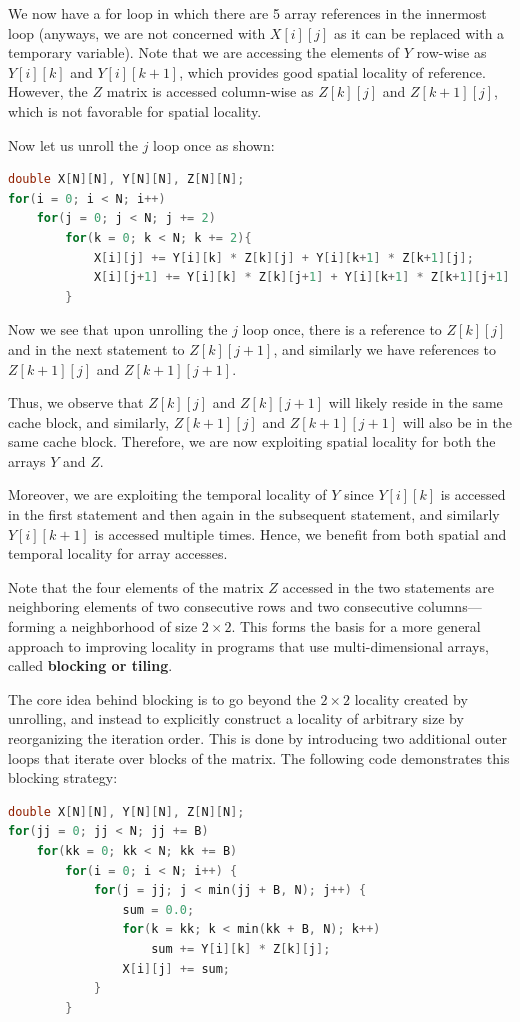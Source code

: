\documentclass[12pt]{book}
\begin{document}
We now have a for loop in which there are 5 array references in the innermost loop (anyways, we are not concerned with $X[i][j]$ as it can be replaced with a temporary variable). Note that we are accessing the elements of $Y$ row-wise as $Y[i][k]$ and $Y[i][k+1]$, which provides good spatial locality of reference. However, the $Z$ matrix is accessed column-wise as $Z[k][j]$ and $Z[k+1][j]$, which is not favorable for spatial locality.

Now let us unroll the $j$ loop once as shown:
\begin{lstlisting}[language=C++]
double X[N][N], Y[N][N], Z[N][N];
for(i = 0; i < N; i++)
    for(j = 0; j < N; j += 2)
        for(k = 0; k < N; k += 2){
            X[i][j] += Y[i][k] * Z[k][j] + Y[i][k+1] * Z[k+1][j];
            X[i][j+1] += Y[i][k] * Z[k][j+1] + Y[i][k+1] * Z[k+1][j+1];
        }
\end{lstlisting}
Now we see that upon unrolling the $j$ loop once, there is a reference to $Z[k][j]$ and in the next statement to $Z[k][j+1]$, and similarly we have references to $Z[k+1][j]$ and $Z[k+1][j+1]$. 

Thus, we observe that $Z[k][j]$ and $Z[k][j+1]$ will likely reside in the same cache block, and similarly, $Z[k+1][j]$ and $Z[k+1][j+1]$ will also be in the same cache block. Therefore, we are now exploiting spatial locality for both the arrays $Y$ and $Z$.

Moreover, we are exploiting the temporal locality of $Y$ since $Y[i][k]$ is accessed in the first statement and then again in the subsequent statement, and similarly $Y[i][k+1]$ is accessed multiple times. Hence, we benefit from both spatial and temporal locality for array accesses.

Note that the four elements of the matrix $Z$ accessed in the two statements are neighboring elements of two consecutive rows and two consecutive columns—forming a neighborhood of size $2 \times 2$. This forms the basis for a more general approach to improving locality in programs that use multi-dimensional arrays, called \textbf{blocking or tiling}. 

The core idea behind blocking is to go beyond the $2 \times 2$ locality created by unrolling, and instead to explicitly construct a locality of arbitrary size by reorganizing the iteration order. This is done by introducing two additional outer loops that iterate over blocks of the matrix. The following code demonstrates this blocking strategy:

\begin{lstlisting}[language=C++, caption=Blocking or Tiling]
double X[N][N], Y[N][N], Z[N][N];
for(jj = 0; jj < N; jj += B)
    for(kk = 0; kk < N; kk += B)
        for(i = 0; i < N; i++) {
            for(j = jj; j < min(jj + B, N); j++) {
                sum = 0.0;
                for(k = kk; k < min(kk + B, N); k++)
                    sum += Y[i][k] * Z[k][j];
                X[i][j] += sum;
            }
        }
\end{lstlisting}
\end{document}
